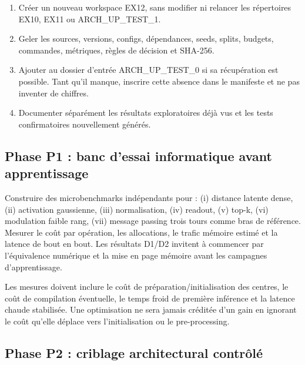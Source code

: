\documentclass[11pt,a4paper]{article}
\begin{document}
\begin{enumerate}
  \item Créer un nouveau workspace EX12, sans modifier ni relancer les répertoires EX10, EX11 ou ARCH\_UP\_TEST\_1.
  \item Geler les sources, versions, configs, dépendances, seeds, splits, budgets, commandes, métriques, règles de décision et SHA-256.
  \item Ajouter au dossier d'entrée ARCH\_UP\_TEST\_0 si sa récupération est possible. Tant qu'il manque, inscrire cette absence dans le manifeste et ne pas inventer de chiffres.
  \item Documenter séparément les résultats exploratoires déjà vus et les tests confirmatoires nouvellement générés.
\end{enumerate}

\subsection{Phase P1 : banc d'essai informatique avant apprentissage}

Construire des microbenchmarks indépendants pour : (i) distance latente dense, (ii) activation gaussienne, (iii) normalisation, (iv) readout, (v) top-k, (vi) modulation faible rang, (vii) message passing trois tours comme bras de référence. Mesurer le coût par opération, les allocations, le trafic mémoire estimé et la latence de bout en bout. Les résultats D1/D2 invitent à commencer par l'équivalence numérique et la mise en page mémoire avant les campagnes d'apprentissage.

Les mesures doivent inclure le coût de préparation/initialisation des centres, le coût de compilation éventuelle, le temps froid de première inférence et la latence chaude stabilisée. Une optimisation ne sera jamais créditée d'un gain en ignorant le coût qu'elle déplace vers l'initialisation ou le pre-processing.

\subsection{Phase P2 : criblage architectural contrôlé}
\end{document}
